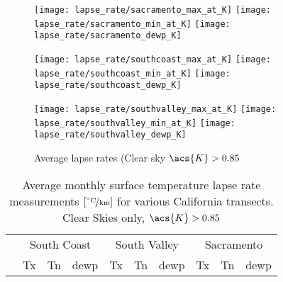 \documentclass{elsart}
\begin{document}
\begin{figure}
  \centering
  \texttt{[image: lapse\_rate/sacramento\_max\_at\_K]}
  \texttt{[image: lapse\_rate/sacramento\_min\_at\_K]} 
  \texttt{[image: lapse\_rate/sacramento\_dewp\_K]}

  \texttt{[image: lapse\_rate/southcoast\_max\_at\_K]}
  \texttt{[image: lapse\_rate/southcoast\_min\_at\_K]} 
  \texttt{[image: lapse\_rate/southcoast\_dewp\_K]}

  \texttt{[image: lapse\_rate/southvalley\_max\_at\_K]}
  \texttt{[image: lapse\_rate/southvalley\_min\_at\_K]} 
  \texttt{[image: lapse\_rate/southvalley\_dewp\_K]}

  \caption{Average lapse rates (Clear sky $\acs{K} > 0.85$}
  \label{fig:lapse_rate}
\end{figure}

\begin{table}
  \centering
  \caption{Average monthly surface temperature lapse rate measurements $[\unitfrac{\ensuremath{^\circ}C}{km}]$ for various California transects.  Clear Skies only, $\acs{K} > 0.85$
  }
\begin{tabular}{c | c c c | c c c | c c c }
& \multicolumn{3}{c|}{South Coast} & \multicolumn{3}{c|}{South Valley} & \multicolumn{3}{c}{Sacramento} \\
\raisebox{1.5ex}{Month} & \acs{Tx} & \acs{Tn} & \acs{dewp} & \acs{Tx} & \acs{Tn}  &\acs{dewp} & \acs{Tx} & \acs{Tn} & \acs{dewp} \\ \hline \hline

\end{tabular}
\label{tab:lapse_rate}
\end{table}
\end{document}

